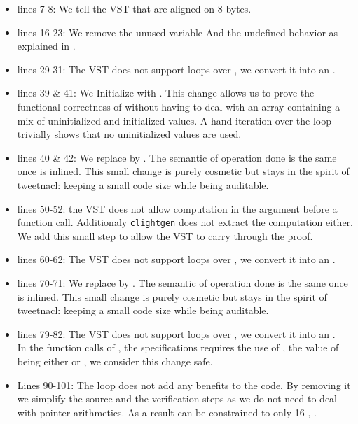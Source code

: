 \begin{itemize}
  \item lines 7-8: We tell the VST that  are
  aligned on 8 bytes.

  \item lines 16-23: We remove the unused variable  And the undefined behavior as explained in .

  \item lines 29-31: The VST does not support  loops over , we convert it into an .

  \item lines 39 \& 41: We Initialize  with .
  This change allows us to prove the functional correctness of  without having to deal with an array containing
  a mix of uninitialized and initialized values.
  A hand iteration over the loop trivially shows that no uninitialized values are used.

  \item lines 40 \& 42: We replace  by . The semantic of operation done is the same once  is inlined. This small change is purely cosmetic but stays in the spirit of tweetnacl: keeping a small code size while being auditable.

  \item lines 50-52: the VST does not allow computation in the argument before a function call. Additionaly \texttt{clightgen} does not extract the computation either. We add this small step to allow the VST to carry through the proof.

  \item lines 60-62: The VST does not support  loops over , we convert it into an .

  \item lines 70-71: We replace  by . The semantic of operation done is the same once  is inlined. This small change is purely cosmetic but stays in the spirit of tweetnacl: keeping a small code size while being auditable.

  \item lines 79-82: The VST does not support  loops over , we convert it into an .\\
  In the function calls of , the specifications requires the use of , the value of  being either  or , we consider this change safe.

  \item Lines 90-101: The  loop does not add any benefits to the code. By removing it we simplify the source and the verification steps as we do not need to deal with pointer arithmetics. As a result  can be constrained to only 16 , \ie {}.

\end{itemize}
